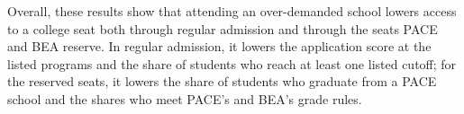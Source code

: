 

Overall, these results show that attending an over-demanded school lowers access to a college seat both through regular admission and through the seats PACE and BEA reserve. In regular admission, it lowers the application score at the listed programs and the share of students who reach at least one listed cutoff; for the reserved seats, it lowers the share of students who graduate from a PACE school and the shares who meet PACE's and BEA's grade rules.
